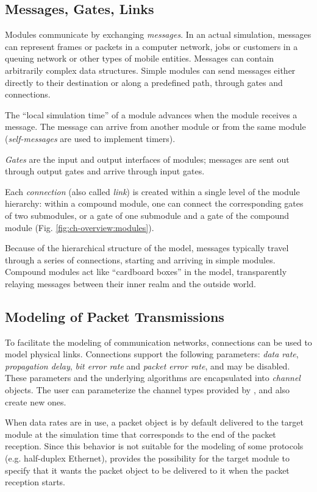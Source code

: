 \subsection{Messages, Gates, Links}

Modules communicate by exchanging
\textit{messages}. In an actual simulation,
messages can represent frames or packets in a computer network, jobs
or customers in a queuing network or other types of mobile entities.
Messages can contain arbitrarily complex data structures. Simple
modules can send messages either directly to their destination or
along a predefined path, through gates and connections.


The ``local simulation time'' of a module advances when the module
receives a message. The message can arrive from another module
or from the same module (\textit{self-messages} are used to implement
timers).


\textit{Gates} are the input and output interfaces of
modules; messages are sent out through output gates and arrive through
input gates.

Each \textit{connection} (also called
\textit{link}) is created within a single level of the
module hierarchy: within a compound module, one can connect the
corresponding gates of two submodules, or a gate of one submodule and
a gate of the compound module (Fig.
\ref{fig:ch-overview:modules}).

Because of the hierarchical structure of the model, messages typically
travel through a series of connections, starting and arriving in simple
modules. Compound modules act like ``cardboard boxes'' in the model,
transparently relaying messages between their inner realm and the
outside world.


\subsection{Modeling of Packet Transmissions}

To facilitate the modeling of communication networks, connections
can be used to model physical links. Connections support
the following parameters: \textit{data rate}, \textit{propagation delay},
\textit{bit error rate} and \textit{packet error rate}, and may be
disabled. These parameters and the underlying algorithms are encapsulated
into \textit{channel} objects. The user can parameterize the channel
types provided by {\opp}, and also create new ones.

When data rates are in use, a packet object is by default delivered to the
target module at the simulation time that corresponds to the end of the
packet reception. Since this behavior is not suitable for the modeling of
some protocols (e.g. half-duplex Ethernet), {\opp} provides the possibility
for the target module to specify that it wants the packet object to be
delivered to it when the packet reception starts.


